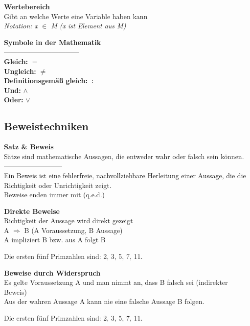 \begin{definitionbox}
\textbf{Wertebereich}\\
Gibt an welche Werte eine Variable haben kann\\
\textit{Notation: x $\in$ M (x ist Element aus M)}
\end{definitionbox}

\begin{definitionbox}
\textbf{Symbole in der Mathematik}\\
---------------------------------\\
\textbf{Gleich:} $=$\\
\textbf{Ungleich:} $\neq$\\
\textbf{Definitionsgemäß gleich:} $\coloneqq$\\
\textbf{Und:} $\wedge$\\
\textbf{Oder:} $\vee$
\end{definitionbox}





\subsection{Beweistechniken}

\begin{definitionbox}
\textbf{Satz \& Beweis}\\
Sätze sind mathematische Aussagen, die entweder wahr oder falsch sein können.\\
--------------------------\\
Ein Beweis ist eine fehlerfreie, nachvollziehbare Herleitung einer Aussage, die die Richtigkeit oder Unrichtigkeit zeigt.\\
Beweise enden immer mit (q.e.d.)
\end{definitionbox}

\begin{definitionbox}
\textbf{Direkte Beweise}\\
Richtigkeit der Aussage wird direkt gezeigt\\
A $\Rightarrow$ B (A Voraussetzung, B Aussage)\\
A impliziert B bzw. aus A folgt B
\end{definitionbox}
\begin{beispielbox}
Die ersten fünf Primzahlen sind: 2, 3, 5, 7, 11.
\end{beispielbox}

\begin{definitionbox}
\textbf{Beweise durch Widerspruch}\\
Es gelte Voraussetzung A und man nimmt an, dass B falsch sei (indirekter Beweis)\\
Aus der wahren Aussage A kann nie eine falsche Aussage B folgen.
\end{definitionbox}
\begin{beispielbox}
Die ersten fünf Primzahlen sind: 2, 3, 5, 7, 11.
\end{beispielbox}

